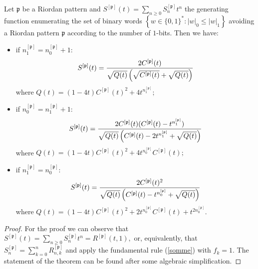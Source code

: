 \begin{teo}
\label{teo2}
Let $\mathfrak{p}$ be  a Riordan pattern and $S^{[\mathfrak{p}]}(t)=\sum_{n\geq
0}S_n^{[\mathfrak{p}]}t^n$ the generating function enumerating the set of binary words $\left\lbrace w\in
\lbrace 0,1 \rbrace^{*}: |w|_0\leq |w|_1\right\rbrace$ avoiding  a Riordan
pattern $\mathfrak{p}$ according to the number of $1$-bits. Then we have:

\begin{itemize}

\item if $n_1^{[\mathfrak{p}]}=n_0^{[\mathfrak{p}]}+1:$
$$S^{[\mathfrak{p}]}(t)={2C^{[\mathfrak{p}]}(t) \over \sqrt{Q(t)}\left(\sqrt{C^{[\mathfrak{p}]}(t)}+ \sqrt{Q(t)} \right)} $$
    where $Q(t)={(1-4t)C^{[\mathfrak{p}]}(t)^2+4t^{n_1^{[\mathfrak{p}]}}};$

\item if $n_0^{[\mathfrak{p}]}=n_1^{[\mathfrak{p}]}+1:$
$$S^{[\mathfrak{p}]}(t)={2C^{[\mathfrak{p}]}(t)(C^{[\mathfrak{p}]}(t)-t^{n_1^{[\mathfrak{p}]}}
) \over \sqrt{Q(t)} \left(C^{[\mathfrak{p}]}(t)-2t^{n_1^{[\mathfrak{p}]}}+ \sqrt{Q(t)} \right) }$$
    where $Q(t)={ (1-4t)C^{[\mathfrak{p}]}(t)^2+4t^{n_0^{[\mathfrak{p}]}}C^{[\mathfrak{p}]}(t)};$

\item if $n_1^{[\mathfrak{p}]}=n_0^{[\mathfrak{p}]}:$
$$S^{[\mathfrak{p}]}(t)={2C^{[\mathfrak{p}]}(t)^2 \over \sqrt{Q(t)}
    \left(C^{[\mathfrak{p}]}(t)-t^{n_0^{[\mathfrak{p}]}}+ \sqrt{Q(t)} \right) }$$
where $Q(t)=(1-4t)C^{[\mathfrak{p}]}(t)^2+2t^{n_0^{[\mathfrak{p}]}}C^{[\mathfrak{p}]}(t)+t^{2n_0^{[\mathfrak{p}]}}.$

\end{itemize}
\end{teo}
\begin{proof}
For the proof we can observe that $S^{[\mathfrak{p}]}(t)=\sum_{n\geq
0}S_n^{[\mathfrak{p}]}t^n=R^{[\mathfrak{p}]}(t,1),$ or, equivalently, that
$S_n^{[\mathfrak{p}]}=\sum_{k=0}^nR_{n, k}^{[\mathfrak{p}]}$ and apply the
fundamental rule (\ref{somme}) with $f_k=1.$ The statement of the theorem can
be found after some algebraic simplification.
\end{proof}

